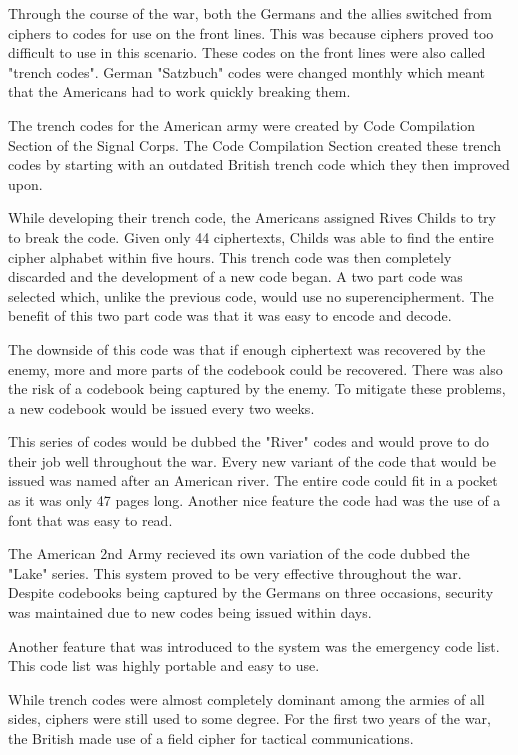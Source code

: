 \documentclass{article}
\begin{document}
    Through the course of the war, both the Germans and the allies
    switched from ciphers to codes for use on the front lines. This was because
    ciphers proved too difficult to use in this scenario. These codes on the front
    lines were also called "trench codes".
    German "Satzbuch" codes were changed monthly which meant that the Americans
    had to work quickly breaking them.

    The trench codes for the American army were created by Code Compilation Section
    of the Signal Corps. The Code Compilation Section created these trench codes
    by starting with an outdated British trench code which they then improved upon.

    While developing their trench code, the Americans assigned Rives Childs to
    try to break the code. Given only 44 ciphertexts, Childs was able to find
    the entire cipher alphabet within five hours.
    This trench code was then completely discarded and the development of a new code began.
    A two part code was selected which, unlike the previous code, would use no superencipherment.
    The benefit of this two part code was that it was easy to encode and decode.

    The downside of this code was that if enough ciphertext was recovered by the enemy,
    more and more parts of the codebook could be recovered.
    There was also the risk of a codebook being captured by the enemy.
    To mitigate these problems, a new codebook would be issued every two weeks.

    This series of codes would be dubbed the "River" codes and would prove
    to do their job well throughout the war. Every new variant of the code
    that would be issued was named after an American river. The entire
    code could fit in a pocket as it was only 47 pages long.
    Another nice feature the code had was the use of a font that was easy to read.

    The American 2nd Army recieved its own variation of the code dubbed the "Lake" series.
    This system proved to be very effective throughout the war.
    Despite codebooks being captured by the Germans on three occasions,
    security was maintained due to new codes being issued within days.

    Another feature that was introduced to the system was the emergency code list.
    This code list was highly portable and easy to use.

    While trench codes were almost completely dominant among the armies of all sides,
    ciphers were still used to some degree.
    For the first two years of the war, the British made use of a field cipher
    for tactical communications.
\end{document}
